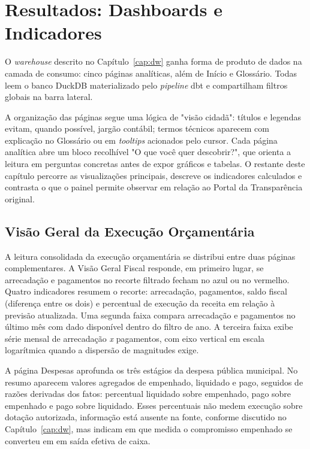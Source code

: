 \chapter{Resultados: Dashboards e Indicadores}
\label{cap:resultados}

O \textit{warehouse} descrito no Capítulo~\ref{cap:dw} ganha forma de produto de dados na camada de consumo: cinco páginas analíticas, além de Início e Glossário. Todas leem o banco DuckDB materializado pelo \textit{pipeline} dbt e compartilham filtros globais na barra lateral.

A organização das páginas segue uma lógica de "visão cidadã": títulos e legendas evitam, quando possível, jargão contábil; termos técnicos aparecem com explicação no Glossário ou em \textit{tooltips} acionados pelo cursor. Cada página analítica abre um bloco recolhível "O que você quer descobrir?", que orienta a leitura em perguntas concretas antes de expor gráficos e tabelas. O restante deste capítulo percorre as visualizações principais, descreve os indicadores calculados e contrasta o que o painel permite observar em relação ao Portal da Transparência original.

\section{Visão Geral da Execução Orçamentária}

A leitura consolidada da execução orçamentária se distribui entre duas páginas complementares. A Visão Geral Fiscal responde, em primeiro lugar, se arrecadação e pagamentos no recorte filtrado fecham no azul ou no vermelho. Quatro indicadores resumem o recorte: arrecadação, pagamentos, saldo fiscal (diferença entre os dois) e percentual de execução da receita em relação à previsão atualizada. Uma segunda faixa compara arrecadação e pagamentos no último mês com dado disponível dentro do filtro de ano. A terceira faixa exibe série mensal de arrecadação \textit{x} pagamentos, com eixo vertical em escala logarítmica quando a dispersão de magnitudes exige.

A página Despesas aprofunda os três estágios da despesa pública municipal. No resumo aparecem valores agregados de empenhado, liquidado e pago, seguidos de razões derivadas dos fatos: percentual liquidado sobre empenhado, pago sobre empenhado e pago sobre liquidado. Esses percentuais não medem execução sobre dotação autorizada, informação está ausente na fonte, conforme discutido no Capítulo~\ref{cap:dw}, mas indicam em que medida o compromisso empenhado se converteu em em saída efetiva de caixa.

